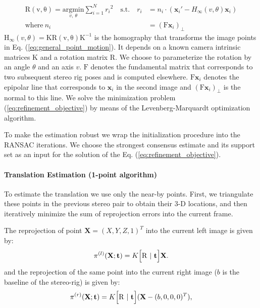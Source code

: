 \documentclass{bmvc2k}
\begin{document}
\begin{equation}\label{eq:refinement_objective}
  \begin{split}
    \mathrm{R(v,\theta)} = \underset{v,\ \theta}{\mathrm{argmin}}
    \sum_{i=1}^N{r_i}^2\quad \text{s.t.}\quad r_i&=n_i\cdot (\mathbf{x}_i'-H_\infty(v,\theta)\mathbf{x}_i) \\
    \text{where}\ n_i &= (\mathrm{F}\mathbf{x}_i)_\perp
  \end{split}
\end{equation}
$\mathrm{H_\infty}(v,\theta) = \mathrm{KR(v,\theta)K^{-1}}$ is the
homography that transforms the image points in Eq.
(\ref{eq:general_point_motion}). It depends on a known camera
intrinsic matrices $\mathrm{K}$ and a rotation matrix $\mathrm{R}$.
We choose to parameterize the rotation by an angle $\theta$ and an
axis $v$.  $\mathrm{F}$ denotes the fundamental matrix that
corresponds to two subsequent stereo rig poses and is computed
elsewhere. $\mathrm{F}\mathbf{x}_i$ denotes the epipolar line that
corresponds to $\mathbf{x}_i$ in the second image and
$(\mathrm{F}\mathbf{x}_i)_\perp$ is the normal to this line.
We solve the minimization problem
(\ref{eq:refinement_objective}) by means of the Levenberg-Marquardt
optimization algorithm.

To make the estimation robust we wrap the initialization procedure
into the RANSAC iterations.  We choose the strongest consensus
estimate and its support set as an input for the solution of the
Eq. (\ref{eq:refinement_objective}).

\paragraph{Translation Estimation (1-point
  algorithm)}\label{sec:stereo_trans} To estimate
the translation we use only the near-by points.  First, we triangulate
these points in the previous stereo pair to obtain their 3-D
locations, and then iteratively minimize the sum of reprojection
errors into the current frame.

The reprojection of point $\mathbf{X}=(X,Y,Z,1)^T$ into the current
left image is given by:
\begin{equation}
  \pi^{(l)}(\mathbf{X};\mathbf{t}) =  K\Bigl[ \mathrm{R}\ |\ \mathbf{t} \Bigr]\mathbf{X}.
\end{equation}
and the reprojection of the same point into the current right image
($b$ is the baseline of the stereo-rig) is given by:
\begin{equation}
  \pi^{(r)}(\mathbf{X};\mathbf{t}) =  K\Bigl[ \mathrm{R}\ |\ \mathbf{t} \Bigr](\mathbf{X} - (b,0,0,0)^T),
\end{equation}
\end{document}
